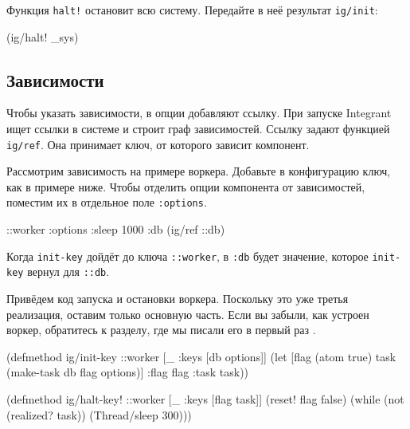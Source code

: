 \fi

\noindent
Функция \verb|halt!| остановит всю систему. Передайте в неё результат
\verb|ig/init|:

\begin{english}
  \begin{clojure}
(ig/halt! _sys)
  \end{clojure}
\end{english}

\subsection{Зависимости}


Чтобы указать зависимости, в опции добавляют ссылку. При запуске Integrant ищет
ссылки в системе и строит граф зависимостей. Ссылку задают функцией
\verb|ig/ref|. Она принимает ключ, от которого зависит компонент.

Рассмотрим зависимость на примере воркера. Добавьте в конфигурацию ключ, как в
примере ниже. Чтобы отделить опции компонента от зависимостей, поместим их в
отдельное поле \verb|:options|.

\begin{english}
  \begin{clojure}
{::worker {:options {:sleep 1000}
           :db (ig/ref ::db)}}
  \end{clojure}
\end{english}

Когда \verb|init-key| дойдёт до ключа \verb|::worker|, в \verb|:db| будет
значение, которое \verb|init-key| вернул для \verb|::db|.

Привёдем код запуска и остановки воркера. Поскольку это уже третья реализация,
оставим только основную часть. Если вы забыли, как устроен воркер, обратитесь к
разделу, где мы писали его в первый раз .

\begin{english}
  \begin{clojure}
(defmethod ig/init-key ::worker
  [_ {:keys [db options]}]
  (let [flag (atom true)
        task (make-task db flag options)]
    {:flag flag :task task}))

(defmethod ig/halt-key! ::worker
  [_ {:keys [flag task]}]
  (reset! flag false)
  (while (not (realized? task))
    (Thread/sleep 300)))
  \end{clojure}
\end{english}

